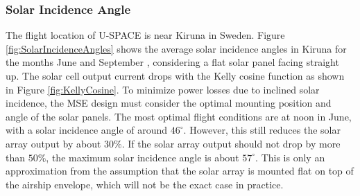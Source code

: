 \subsubsection*{Solar Incidence Angle}
The flight location of U-SPACE is near Kiruna in Sweden. Figure \ref{fig:SolarIncidenceAngles} shows the average solar incidence angles in Kiruna for the months June and September \cite{web:solarincidence}, considering a flat solar panel facing straight up.
The solar cell output current drops with the Kelly cosine function as shown in Figure \ref{fig:KellyCosine}. To minimize power losses due to inclined solar incidence, the \ac{MSE} design must consider the optimal mounting position and angle of the solar panels. The most optimal flight conditions are at noon in June, with a solar incidence angle of around $46^{\circ}$. However, this still reduces the solar array output by about $30\%$. If the solar array output should not drop by more than $50\%$, the maximum solar incidence angle is about $57^{\circ}$. This is only an approximation from the assumption that the solar array is mounted flat on top of the airship envelope, which will not be the exact case in practice.
%
